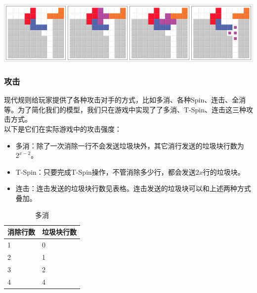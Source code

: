 \documentclass[10pt,UTF8]{article}
\newenvironment{Figure}
  {\par\medskip\noindent\minipage{\linewidth}}
  {\endminipage\par\medskip}
\begin{document}
\begin{multicols}{2}
\begin{Figure}
    \centering
    \includegraphics[width=1\textwidth]{figure/spin2.png}
\end{Figure}

\subsubsection{攻击}

现代规则给玩家提供了各种攻击对手的方式，比如多消、各种Spin、连击、全消等。为了简化我们的模型，我们只在游戏中实现了了多消、T-Spin、连击这三种攻击方式。\\

以下是它们在实际游戏中的攻击强度：\\

\begin{itemize}
    \itemsep-5pt
    \item 多消：除了一次消除一行不会发送垃圾块外，其它消行发送的垃圾块行数为$2^{x-2}$。
    \item T-Spin：只要完成T-Spin操作，不管消除多少行，都会发送$2x$行的垃圾块。
    \item 连击：连击发送的垃圾块行数见表格。连击发送的垃圾块可以和上述两种方式叠加。
\end{itemize}

\begin{table}[h]
    \centering
    \caption{多消}
    \begin{tabular}{@{}ll@{}}
        \toprule
        消除行数 & 垃圾块行数 \\ \midrule
        1       & 0          \\
        2       & 1          \\
        3       & 2          \\
        4       & 4          \\ \bottomrule
    \end{tabular}
\end{table}


\end{multicols}
\end{document}
